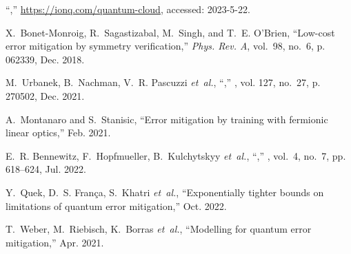 \documentclass[journal,onecolumn]{IEEEtran}
\begin{document}
\begin{thebibliography}{48}
``,''
  \url{https://ionq.com/quantum-cloud}, accessed: 2023-5-22.

X.~Bonet-Monroig, R.~Sagastizabal, M.~Singh, and T.~E. O'Brien, ``Low-cost
  error mitigation by symmetry verification,'' \emph{Phys. Rev. A}, vol.~98,
  no.~6, p. 062339, Dec. 2018.

M.~Urbanek, B.~Nachman, V.~R. Pascuzzi \emph{et~al.},
  ``,'' \emph{}, vol. 127, no.~27, p. 270502, Dec. 2021.

A.~Montanaro and S.~Stanisic, ``Error mitigation by training with fermionic
  linear optics,'' Feb. 2021.

E.~R. Bennewitz, F.~Hopfmueller, B.~Kulchytskyy \emph{et~al.},
  ``,'' \emph{},
  vol.~4, no.~7, pp. 618--624, Jul. 2022.

Y.~Quek, D.~S. Fran{\c c}a, S.~Khatri \emph{et~al.}, ``Exponentially tighter
  bounds on limitations of quantum error mitigation,'' Oct. 2022.

T.~Weber, M.~Riebisch, K.~Borras \emph{et~al.}, ``Modelling for quantum error
  mitigation,'' Apr. 2021.

\end{thebibliography}
\end{document}

